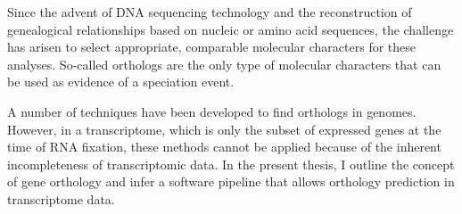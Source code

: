 Since the advent of DNA sequencing technology and the reconstruction of
genealogical relationships based on nucleic or amino acid sequences, the
challenge has arisen to select appropriate, comparable molecular characters for
these analyses. So-called orthologs are the only type of molecular characters
that can be used as evidence of a speciation event. 

A number of techniques have been developed to find orthologs in genomes.
However, in a transcriptome, which is only the subset of expressed genes at the
time of RNA fixation, these methods cannot be applied because of the inherent
incompleteness of transcriptomic data. In the present thesis, I outline the
concept  of gene orthology and infer a software pipeline that allows orthology
prediction in transcriptome data.

